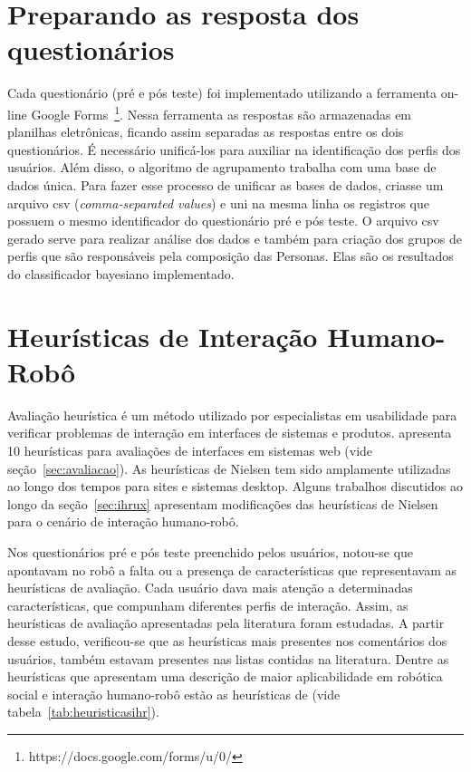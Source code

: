 \section{Preparando as resposta dos questionários}
\label{sec:respostasbd}
Cada questionário (pré e pós teste) foi implementado utilizando a ferramenta on-line Google Forms~\footnote{https://docs.google.com/forms/u/0/}. Nessa ferramenta as respostas são armazenadas em planilhas eletrônicas, ficando assim separadas as respostas entre os dois questionários. É necessário unificá-los para auxiliar na identificação dos perfis dos usuários. Além disso, o algoritmo de agrupamento trabalha com uma base de dados única. Para fazer esse processo de unificar as bases de dados, criasse um arquivo csv (\emph{comma-separated values}) e uni na mesma linha os registros que possuem o mesmo identificador do questionário pré e pós teste. O arquivo csv gerado serve para realizar análise dos dados e também para criação dos grupos de perfis que são responsáveis pela composição das Personas. Elas são os resultados do classificador bayesiano implementado.

\section{Heurísticas de Interação Humano-Robô}
\label{sec:heuristicas}
Avaliação heurística é um método utilizado por especialistas em usabilidade para verificar problemas de interação em interfaces de sistemas e produtos.  apresenta 10 heurísticas para avaliações de interfaces em sistemas web (vide seção~\ref{sec:avaliacao}). As heurísticas de Nielsen tem sido amplamente utilizadas ao longo dos tempos para sites e sistemas desktop. Alguns trabalhos discutidos ao longo da seção~\ref{sec:ihrux} apresentam modificações das heurísticas de Nielsen para o cenário de interação humano-robô.

Nos questionários pré e pós teste preenchido pelos usuários, notou-se que apontavam no robô a falta ou a presença de características que representavam as heurísticas de avaliação. Cada usuário dava mais atenção a determinadas características, que compunham diferentes perfis de interação. Assim, as heurísticas de avaliação apresentadas pela literatura foram estudadas. A partir desse estudo, verificou-se que as heurísticas mais presentes nos comentários dos usuários, também estavam presentes nas listas contidas na literatura. Dentre as heurísticas que apresentam uma descrição de maior aplicabilidade em robótica social e interação humano-robô estão as heurísticas de  (vide tabela~\ref{tab:heuristicasihr}).

